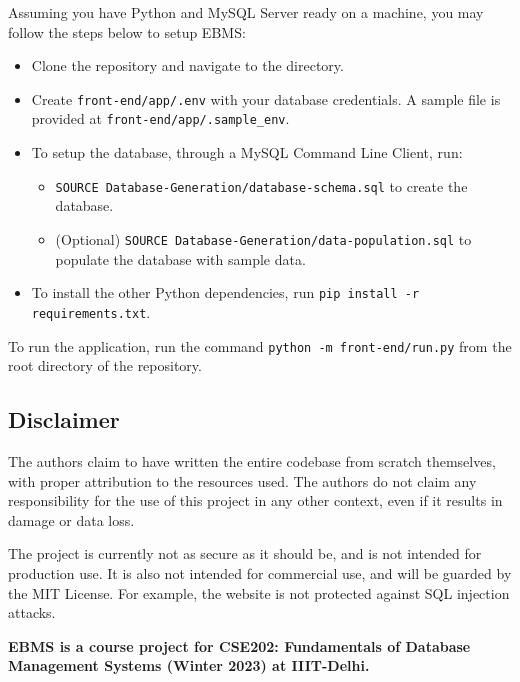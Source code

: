 \begin{setupbox}
    Assuming you have Python and MySQL Server ready on a machine, you may follow the steps below to setup EBMS:
    \begin{itemize}
        \item Clone the repository and navigate to the directory.
        \item Create \texttt{front-end/app/.env} with your database credentials. A sample file is provided at \texttt{front-end/app/.sample\_env}.
        \item To setup the database, through a MySQL Command Line Client, run:
        \begin{itemize}
            \item \texttt{SOURCE Database-Generation/database-schema.sql} to create the database.
            \item (Optional) \texttt{SOURCE Database-Generation/data-population.sql} to populate the database with sample data.
        \end{itemize}
        \item To install the other Python dependencies, run \texttt{pip install -r requirements.txt}.
    \end{itemize}
\end{setupbox}

\begin{setupbox}
    To run the application, run the command \texttt{python -m front-end/run.py} from the root directory of the repository.
\end{setupbox}

\pagebreak

\subsection*{Disclaimer}

The authors claim to have written the entire codebase from scratch themselves, with proper attribution to the resources used.
The authors do not claim any responsibility for the use of this project in any other context, even if it results in damage or data loss.

The project is currently not as secure as it should be, and is not intended for production use.
It is also not intended for commercial use, and will be guarded by the MIT License.
For example, the website is not protected against SQL injection attacks.

\vfill

\begin{center}
    \begin{tcolorbox}[colback=red!5!white,colframe=red!75!black]
        \centering
        \textbf{EBMS is a course project for CSE202: Fundamentals of Database Management Systems (Winter 2023) at IIIT-Delhi.}
    \end{tcolorbox}
\end{center}